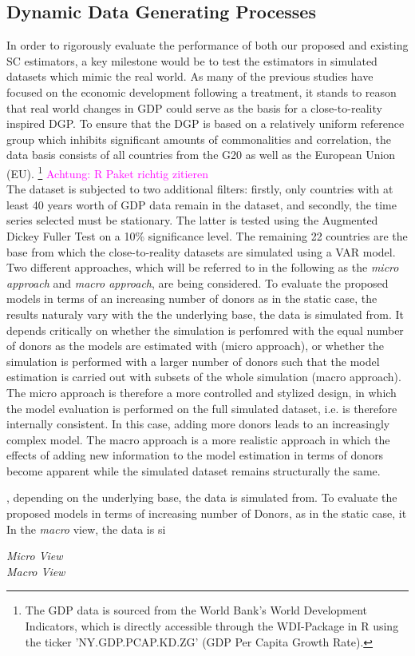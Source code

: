 \subsection{Dynamic Data Generating Processes}
In order to rigorously evaluate the performance of both our proposed and existing SC estimators, a key milestone would be to test the estimators in simulated datasets which mimic the real world. As many of the previous studies have focused on the economic development following a treatment, it stands to reason that real world changes in GDP could serve as the basis for a close-to-reality inspired DGP.
To ensure that the DGP is based on a relatively uniform reference group which inhibits significant amounts of commonalities and correlation, the data basis consists of all countries from the G20 as well as the European Union (EU). \footnote{The GDP data is sourced from the World Bank's World Development Indicators, which is directly accessible through the WDI-Package in R using the ticker 'NY.GDP.PCAP.KD.ZG' (GDP Per Capita Growth Rate).} 
\textcolor{magenta}{Achtung: R Paket richtig zitieren}\\
The dataset is subjected to two additional filters: firstly, only countries with at least 40 years worth of GDP data remain in the dataset, and secondly, the time series selected must be stationary. The latter is tested using the Augmented Dickey Fuller Test on a 10\% significance level. The remaining 22 countries are the base from which the close-to-reality datasets are simulated using a VAR model.\\
Two different approaches, which will be referred to in the following as the \textit{micro approach} and \textit{macro approach}, are being considered. To evaluate the proposed models in terms of an increasing number of donors as in the static case, the results naturaly vary with the the underlying base, the data is simulated from. 
It depends critically on whether the simulation is perfomred with the equal number of donors as the models are estimated with (micro approach), or whether the simulation is performed with a larger number of donors such that the model estimation is carried out with subsets of the whole simulation (macro approach).
The micro approach is therefore a more controlled and stylized design, in which the model evaluation is performed on the full simulated dataset, i.e. is therefore internally consistent. In this case, adding more donors leads to an increasingly complex model. The macro approach is a more realistic approach in which the effects of adding new information to the model estimation in terms of donors become apparent while the simulated dataset remains structurally the same.


, depending on the underlying base, the data is simulated from.
To evaluate the proposed models in terms of increasing number of Donors, as in the static case, it
In the \textit{macro} view, the data is si


\textit{Micro View} \\


\textit{Macro View} \\
